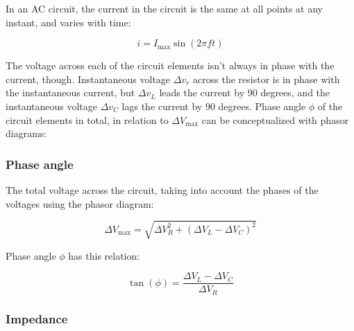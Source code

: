 \documentclass[12pt]{article}
\begin{document}
In an AC circuit, the current in the circuit is the same at all points at any instant, and varies with time:

\[
\boxed{
i = I_{\text{max}} \sin(2\pi ft)
}
\]

The voltage across each of the circuit elements isn't always in phase with the current, though. Instantaneous voltage $\Delta v_r$ across the resistor is in phase with the instantaneous current, but $\Delta v_L$ leads the current by $90$ degrees, and the instantaneous voltage $\Delta v_C$ lags the current by $90$ degrees.
Phase angle $\phi$ of the circuit elements in total, in relation to $\Delta V_{\text{max}}$ can be conceptualized with phasor diagrams:

\begin{center}
\end{center}

\subsubsection{Phase angle}

The total voltage across the circuit, taking into account the phases of the voltages using the phasor diagram:

\[
\boxed{
\Delta V_{\text{max}} = \sqrt{\Delta V_R^2 + (\Delta V_L - \Delta V_C)^2}
}
\]

Phase angle $\phi$ has this relation:

\[
\boxed{
\tan(\phi) = \frac{\Delta V_L - \Delta V_C}{\Delta V_R}
}
\]

\subsubsection{Impedance}
\end{document}
